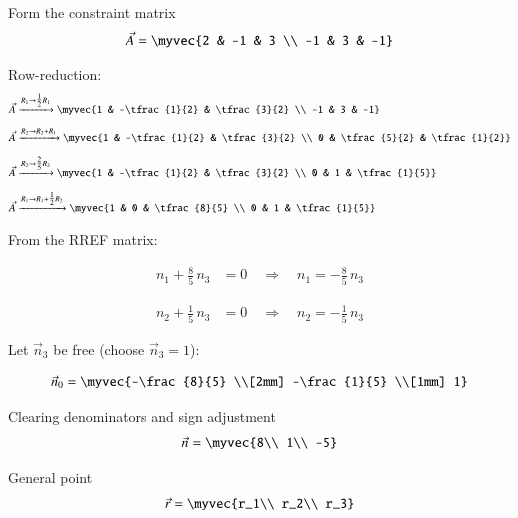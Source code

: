 \documentclass[journal]{IEEEtran}
\begin{document}
\noindent Form the constraint matrix
\begin{align}
\vec{A} = \myvec{2 & -1 & 3 \\ -1 & 3 & -1}
\end{align}

\noindent Row-reduction:
\begin{align}
\vec{A} &\xrightarrow{R_1 \to \tfrac{1}{2}R_1} \myvec{1 & -\tfrac{1}{2} & \tfrac{3}{2} \\ -1 & 3 & -1} \\[6pt]
\vec{A} &\xrightarrow{R_2 \to R_2 + R_1} \myvec{1 & -\tfrac{1}{2} & \tfrac{3}{2} \\ 0 & \tfrac{5}{2} & \tfrac{1}{2}} \\[6pt]
\vec{A} &\xrightarrow{R_2 \to \tfrac{2}{5}R_2} \myvec{1 & -\tfrac{1}{2} & \tfrac{3}{2} \\ 0 & 1 & \tfrac{1}{5}} \\[6pt]
\vec{A} &\xrightarrow{R_1 \to R_1 + \tfrac{1}{2}R_2} \myvec{1 & 0 & \tfrac{8}{5} \\ 0 & 1 & \tfrac{1}{5}}
\end{align}

\noindent From the RREF matrix:

\begin{align}
n_1 + \frac{8}{5}\,n_3 &= 0 \quad \Rightarrow \quad n_1 = -\frac{8}{5}\,n_3
\end{align}

\begin{align}
n_2 + \frac{1}{5}\,n_3 &= 0 \quad \Rightarrow \quad n_2 = -\frac{1}{5}\,n_3
\end{align}

\noindent Let \(\vec{n}_3\) be free (choose \(\vec{n}_3 = 1\)):

\begin{align}
\vec{n}_0 = \myvec{-\frac{8}{5} \\[2mm] -\frac{1}{5} \\[1mm] 1}
\end{align}

\noindent Clearing denominators and sign adjustment
\begin{align}
\vec{n} = \myvec{8\\ 1\\ -5}
\end{align}

\noindent General point
\begin{align}
\vec{r} = \myvec{r_1\\ r_2\\ r_3}
\end{align}
\end{document}
